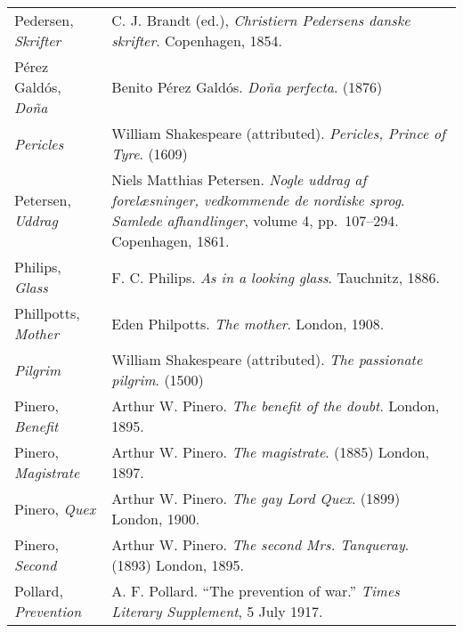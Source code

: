 \begin{longtable}{p{} p{}}
Pedersen, \textit{Skrifter} & C. J. Brandt (ed.), \textit{Christiern Pedersens danske skrifter}. Copenhagen, 1854. \\ %

Pérez Galdós, \textit{Doña} & Benito Pérez Galdós. \textit{Doña perfecta}. (1876) \\

\textit{Pericles} & William Shakespeare (attributed). \textit{Pericles, Prince of Tyre}. (1609) \\

Petersen, \textit{Uddrag} & Niels Matthias Petersen. \textit{Nogle uddrag af forelæsninger, vedkommende de nordiske sprog}. \textit{Samlede afhandlinger}, volume 4, pp.~107--294. Copenhagen, 1861. \\ 

Philips, \textit{Glass} & F. C. Philips. \textit{As in a looking glass}. Tauchnitz, 1886.  \\

Phillpotts, \textit{Mother} & Eden Philpotts. \textit{The mother}. London, 1908.  \\

\textit{Pilgrim} & William Shakespeare (attributed). \textit{The passionate pilgrim}. (1500) \\

Pinero, \textit{Benefit} & Arthur W. Pinero. \textit{The benefit of the doubt}. London, 1895.  \\
Pinero, \textit{Magistrate} & Arthur W. Pinero. \textit{The magistrate}. (1885) London, 1897.  \\
Pinero, \textit{Quex} & Arthur W. Pinero. \textit{The gay Lord Quex}. (1899) London, 1900.  \\
Pinero, \textit{Second} & Arthur W. Pinero. \textit{The second Mrs. Tanqueray}. (1893) London, 1895.  \\
%

Pollard, \textit{Prevention} & A. F. Pollard. ``The prevention of war.'' \textit{Times Literary Supplement}, 5 July 1917. \\ %
% 


\end{longtable}
